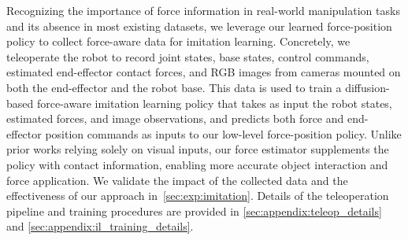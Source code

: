 \documentclass{article}
\begin{document}
Recognizing the importance of force information in real-world manipulation tasks and its absence in most existing datasets, we leverage our learned force-position policy to collect force-aware data for imitation learning. Concretely, we teleoperate the robot to record joint states, base states, control commands, estimated end-effector contact forces, and RGB images from cameras mounted on both the end-effector and the robot base. This data is used to train a diffusion-based force-aware imitation learning policy that takes as input the robot states, estimated forces, and image observations, and predicts both force and end-effector position commands as inputs to our low-level force-position policy. Unlike prior works relying solely on visual inputs, our force estimator supplements the policy with contact information, enabling more accurate object interaction and force application. We validate the impact of the collected data and the effectiveness of our approach in~\cref{sec:exp:imitation}. Details of the teleoperation pipeline and training procedures are provided in \cref{sec:appendix:teleop_details} and \cref{sec:appendix:il_training_details}.
\vspace{-0.5em}

\end{document}

